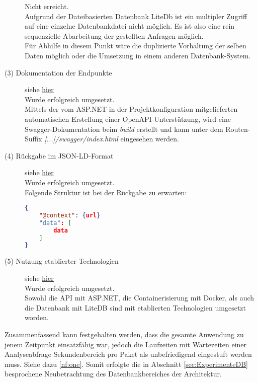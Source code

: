 \begin{description}
            Nicht erreicht.
            \\
            Aufgrund der Dateibasierten Datenbank LiteDb ist ein multipler Zugriff auf eine einzelne Datenbankdatei nicht möglich. Es ist also eine rein sequenzielle Abarbeitung der gestellten Anfragen möglich.
            \\
            Für Abhilfe in diesem Punkt wäre die duplizierte Vorhaltung der selben Daten möglich oder die Umsetzung in einem anderen Datenbank-System.
        \item[(3) Dokumentation der Endpunkte] siehe \hyperref[nf:three]{\underline{hier}} \hfill \\
            Wurde erfolgreich umgesetzt.
            \\
            Mittels der vom ASP.NET in der Projektkonfiguration mitgelieferten automatischen Erstellung einer OpenAPI-Unterstützung, wird eine Swagger-Dokumentation beim \textit{build} erstellt und kann unter dem Routen-Suffix \textit{[...]/swagger/index.html} eingesehen werden.
        \item[(4) Rückgabe im \acs{JSON-LD}-Format] siehe \hyperref[nf:four]{\underline{hier}} \hfill \\
            Wurde erfolgreich umgesetzt.
            \\
            Folgende Struktur ist bei der Rückgabe zu erwarten:
            \begin{lstlisting}[language=json,firstnumber=1]
{
    "@context": {url}
    "data": [
        data
    ]
}
            \end{lstlisting}
        \item[(5) Nutzung etablierter Technologien] siehe \hyperref[nf:five]{\underline{hier}} \hfill \\
            Wurde erfolgreich umgesetzt.
            \\
            Sowohl die \ac{API} mit ASP.NET, die Containerisierung mit Docker, als auch die Datenbank mit LiteDB sind mit etablierten Technologien umgesetzt worden.
    \end{description}

    \noindent Zusammenfassend kann festgehalten werden, dass die gesamte Anwendung zu jenem Zeitpunkt einsatzfähig war, jedoch die Laufzeiten mit Wartezeiten einer Analyseabfrage Sekundenbereich pro Paket als unbefriedigend eingestuft werden muss. Siehe dazu \ref{nf:one}.
    Somit erfolgte die in Abschnitt \ref{sec:ExperimenteDB}  besprochene Neubetrachtung des Datenbankbereiches der Architektur.

